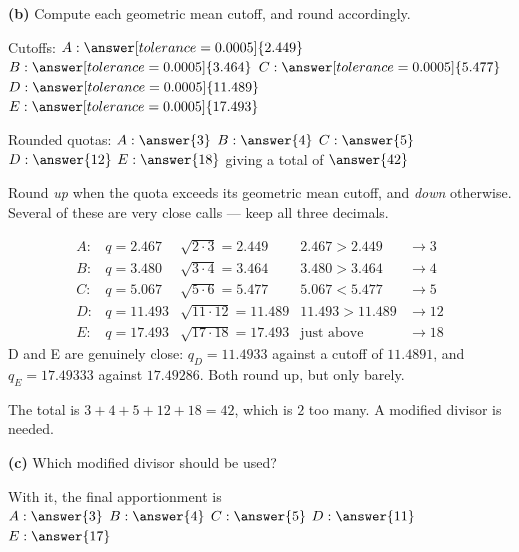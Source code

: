 \documentclass[12pt]{ximera}
\begin{document}
\begin{problem}
\begin{prompt}
\textbf{(b)} Compute each geometric mean cutoff, and round accordingly.

Cutoffs: $A: \answer[tolerance=0.0005]{2.449}$ \quad
$B: \answer[tolerance=0.0005]{3.464}$ \quad
$C: \answer[tolerance=0.0005]{5.477}$ \quad
$D: \answer[tolerance=0.0005]{11.489}$ \quad
$E: \answer[tolerance=0.0005]{17.493}$

\smallskip
Rounded quotas: $A: \answer{3}$ \quad $B: \answer{4}$ \quad $C: \answer{5}$ \quad
$D: \answer{12}$ \quad $E: \answer{18}$ \quad giving a total of $\answer{42}$

\begin{hint}
Round \emph{up} when the quota exceeds its geometric mean cutoff, and \emph{down}
otherwise. Several of these are very close calls --- keep all three decimals.
\end{hint}

\begin{feedback}
\[
\begin{array}{lllll}
A: & q = 2.467 & \sqrt{2\cdot 3}=2.449 & 2.467 > 2.449 & \to 3\\
B: & q = 3.480 & \sqrt{3\cdot 4}=3.464 & 3.480 > 3.464 & \to 4\\
C: & q = 5.067 & \sqrt{5\cdot 6}=5.477 & 5.067 < 5.477 & \to 5\\
D: & q = 11.493 & \sqrt{11\cdot 12}=11.489 & 11.493 > 11.489 & \to 12\\
E: & q = 17.493 & \sqrt{17\cdot 18}=17.493 & \text{just above} & \to 18
\end{array}
\]
D and E are genuinely close: $q_D = 11.4933$ against a cutoff of $11.4891$, and
$q_E = 17.49333$ against $17.49286$. Both round up, but only barely.

The total is $3+4+5+12+18 = 42$, which is $2$ too many. A modified divisor is needed.
\end{feedback}
\end{prompt}

\begin{prompt}
\textbf{(c)} Which modified divisor should be used?

\begin{multipleChoice}
\end{multipleChoice}

With it, the final apportionment is \\
$A: \answer{3}$ \quad $B: \answer{4}$ \quad $C: \answer{5}$ \quad $D: \answer{11}$
\quad $E: \answer{17}$


\end{prompt}
\end{problem}
\end{document}
